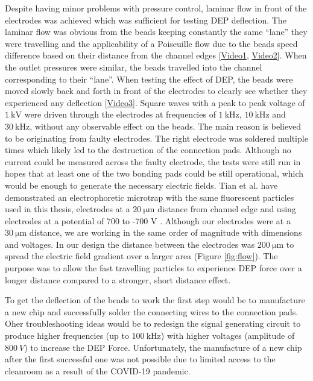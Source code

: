 \documentclass[final]{jyflluk}
\begin{document}
Despite having minor problems with pressure control, laminar flow in front of the electrodes was achieved which was sufficient for testing DEP deflection. The laminar flow was obvious from the beads keeping constantly the same “lane” they were travelling and the applicability of a Poiseuille flow due to the beads speed difference based on their distance from the channel edges [\href{https://youtu.be/iNh1GMUPQsE}{Video1}, \href{https://youtu.be/Xz-v59IJdyM}{Video2}]. When the outlet pressures were similar, the beads travelled into the channel corresponding to their “lane”. When testing the effect of DEP, the beads were moved slowly back and forth in front of the electrodes to clearly see whether they experienced any deflection [\href{https://youtu.be/15CEVs_O_H0}{Video3}]. Square waves with a peak to peak voltage of $\SI{1}{\kilo \volt}$ were driven through the electrodes at frequencies of $\SI{1}{\kilo \Hz}$, $\SI{10}{\kilo \Hz}$ and $\SI{30}{\kilo \Hz}$, without any observable effect on the beads. The main reason is believed to be originating from faulty electrodes. The right electrode was soldered multiple times which likely led to the destruction of the connection pads. Although no current could be measured across the faulty electrode, the tests were still run in hopes that at least one of the two bonding pads could be still operational, which would be enough to generate the necessary electric fields. Tian et al. have demonstrated an electrophoretic microtrap with the same fluorescent particles used in this thesis, electrodes at a $\SI{20}{\micro \metre}$ distance from channel edge and using electrodes at a potential of  700 to -700 V \cite{tian2018handy}. Although our electrodes were at a $\SI{30}{\micro \metre}$ distance, we are working in the same order of magnitude with dimensions and voltages. In our design the distance between the electrodes was $\SI{200}{\micro \metre}$ to spread the electric field gradient over a larger area (Figure \ref{fig:flow}). The purpose was to allow the fast travelling particles to experience DEP force over a longer distance compared to a stronger, short distance effect.

To get the deflection of the beads to work the first step would be to manufacture a new chip and successfully solder the connecting wires to the connection pads. Oher troubleshooting ideas would be to redesign the signal generating circuit to produce higher frequencies (up to $\SI{100}{\kilo \Hz}$) with higher voltages (amplitude of $\SI{800}{V}$) to increase the DEP Force. Unfortunately, the manufacture of a new chip after the first successful one was not possible due to limited access to the cleanroom as a result of the COVID-19 pandemic.
\end{document}
